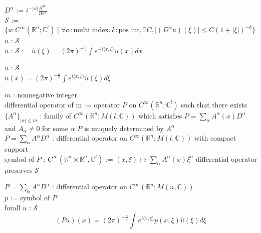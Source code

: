 \begin{Definition}
\itemdefi
  \Define \(D^\alpha\) := \(i^{- \lvert \alpha \rvert} \frac{\partial ^{\lvert \alpha \rvert}}{\partial x^\alpha}\) \\
  \Define \(\mathscr{S}\) := \\
  \(\{u : C^{\infty}(\mathbb{R}^n;\mathbb{C}^l) \mid \forall \alpha : \text{multi index} , k : \text{pos int} , \exists C , \lvert (D^\alpha u)(\xi) \rvert \leq C (1 + \lvert \xi \rvert)^{-k}\}\)
\itemdefi
  \For \(u\) : \(\mathscr{S}\) \\
  \Define \(\hat{u}\) : \(\mathscr{S}\) := \( \hat{u}(\xi) = (2\pi)^{- \frac{n}{2}} \int e^{- i \langle x , \xi \rangle} u(x) dx \)
\end{Definition}

\begin{Theorem}
\itemprop
  \For \(u\) : \(\mathscr{S}\) \\
  \Then \( u(x) = (2\pi)^{- \frac{n}{2}} \int e^{i \langle x , \xi \rangle} \hat{u}(\xi) d\xi \)
\end{Theorem}

\begin{Definition}
\itemdefi
  \For \(m\) : nonnegative integer \\
  \Define differential operator of m := operator \(P\) on \(C^{\infty}(\mathbb{R}^n ; \mathbb{C}^l)\) such that there exists \(\{A^\alpha\}_{\lvert \alpha \rvert \leq m}\) : family of \(C^{\infty}(\mathbb{R}^n ; M(l , \mathbb{C}))\) which satisfies \(P = \sum_{\alpha} A^\alpha(x) D^\alpha\) and \(A_{\alpha} \not = 0\) for some \(\alpha\)
\itemprop
  \Then \(P\) is uniquely determined by \(A^\alpha\)
  \\ \ADMIT
\itemdefi
  \For \(P = \sum_{\alpha} A^\alpha D^\alpha\) : differential operator on \(C^{\infty}(\mathbb{R}^n ; M(l , \mathbb{C}))\) with compact support \\
  \Define symbol of \(P\) : \(C^\infty(\mathbb{R}^n \times \mathbb{R}^n , \mathbb{C}^l)\) := \((x,\xi) \mapsto \sum_{\alpha} A^\alpha(x) \xi^\alpha\)
\itemprop
  \Then differential operator preserves \(\mathscr{S}\)
  \\ \ADMIT
\end{Definition}

\begin{Theorem}
\itemprop
  \For \(P = \sum_{\alpha} A^\alpha D^\alpha\) : differential operator on \(C^{\infty}(\mathbb{R}^n ; M(n , \mathbb{C}))\) \\
  \Let \(p\) := symbol of \(P\) \\
  \Then forall \(u\) : \(\mathscr{S}\)
  \[
    (P u) (x) = (2\pi)^{-\frac{n}{2}} \int e^{i \langle x , \xi \rangle} p(x , \xi) \hat{u}(\xi) d \xi
  \]
\end{Theorem}

